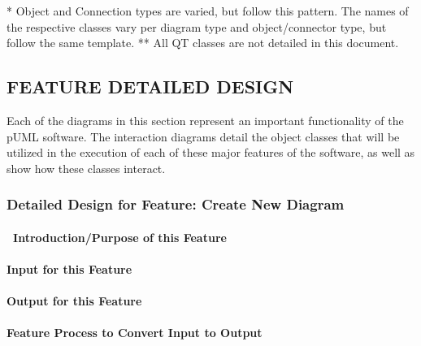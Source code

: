 \documentclass[twoside,letterpaper]{article}
\begin{document}
{\begin{landscape}
\begin{flushleft}
\begin{supertabular}{|m{1.65in}|m{1.0in}|m{3.0in}|m{1.65in}|m{1.65in}|}
\end{supertabular}
\end{flushleft}

{* Object and Connection types are varied, but follow this pattern. \newline
The names of the respective classes vary per diagram type and object/connector type, but follow the same template.
** All QT classes are not detailed in this document.
}



\end{landscape}

\clearpage


\subsection[FEATURE DETAILED DESIGN]
{\bfseries FEATURE DETAILED DESIGN}
{
Each of the diagrams in this section represent an important functionality
of the pUML software.  The interaction diagrams detail the object classes
that will be utilized in the execution of each of these major features of
the software, as well as show how these classes interact.
}


% 
%

\subsubsection{Detailed Design for Feature: Create New Diagram }
\paragraph[\ Introduction/Purpose of this Feature]
{\ Introduction/Purpose of this Feature}
{

}

\paragraph[Input for this Feature]{Input for this Feature}
{

}

\paragraph{Output for this Feature}
{

}

\paragraph{Feature Process to Convert Input to Output}
{

}}
\end{document}
